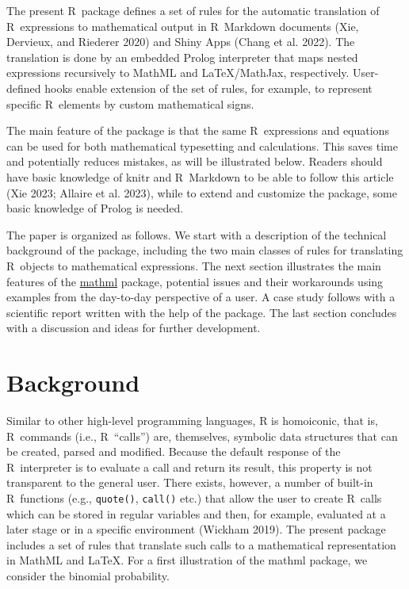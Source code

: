 The present R~package defines a set of rules for the automatic
translation of R~expressions to mathematical output in R~Markdown
documents (Xie, Dervieux, and Riederer 2020) and Shiny Apps (Chang et al. 2022).
The translation is done by an embedded Prolog interpreter
that maps nested expressions recursively to MathML and LaTeX/MathJax,
respectively. User-defined hooks enable extension of the set of rules,
for example, to represent specific R~elements by custom mathematical
signs.

The main feature of the package is that the same R~expressions and
equations can be used for both mathematical typesetting and
calculations. This saves time and potentially reduces mistakes, as will
be illustrated below. Readers should have basic knowledge of knitr and
R~Markdown to be able to follow this article (Xie 2023; Allaire et al. 2023),
while to extend and customize the package, some basic knowledge
of Prolog is needed.

The paper is organized as follows. We start with a description of the
technical background of the package, including the two main classes of
rules for translating R~objects to mathematical expressions. The next
section illustrates the main features of the
\href{https://CRAN.R-project.org/package=mathml}{mathml} package, potential
issues and their workarounds using examples from the day-to-day
perspective of a user. A case study follows with a scientific report
written with the help of the package. The last section concludes with a
discussion and ideas for further development.

\hypertarget{background}{%
\section{Background}\label{background}}

Similar to other high-level programming languages, R is homoiconic, that
is, R~commands (i.e., R~``calls'') are, themselves, symbolic data
structures that can be created, parsed and modified. Because the default
response of the R~interpreter is to evaluate a call and return its
result, this property is not transparent to the general user. There
exists, however, a number of built-in R~functions (e.g., \texttt{quote()},
\texttt{call()} etc.) that allow the user to create R~calls which can be stored
in regular variables and then, for example, evaluated at a later stage
or in a specific environment (Wickham 2019). The present package
includes a set of rules that translate such calls to a mathematical
representation in MathML and LaTeX. For a first illustration of the
mathml package, we consider the binomial probability.

